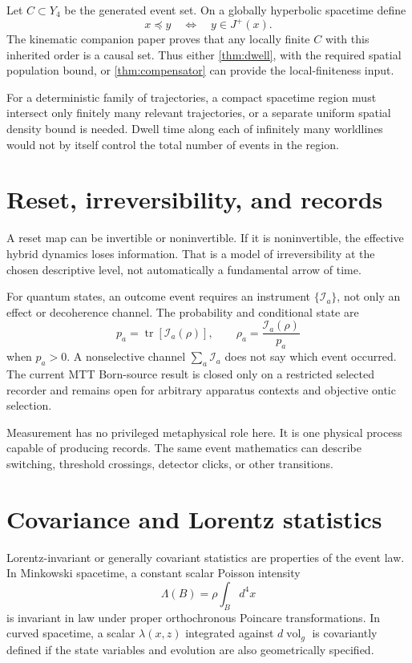 \documentclass[11pt]{article}
\theoremstyle{definition}
\theoremstyle{remark}
\newcommand{\vol}{\operatorname{vol}}
\newcommand{\tr}{\operatorname{tr}}
\begin{document}
Let \(C\subset Y_4\) be the generated event set. On a globally hyperbolic
spacetime define
\[
 x\preceq y
 \quad\Longleftrightarrow\quad
 y\in J^+(x).
\]
The kinematic companion paper proves that any locally finite \(C\) with
this inherited order is a causal set. Thus either
\autoref{thm:dwell}, with the required spatial population bound, or
\autoref{thm:compensator} can provide the local-finiteness input.

For a deterministic family of trajectories, a compact spacetime region must
intersect only finitely many relevant trajectories, or a separate uniform
spatial density bound is needed. Dwell time along each of infinitely many
worldlines would not by itself control the total number of events in the
region.

\section{Reset, irreversibility, and records}

A reset map can be invertible or noninvertible. If it is noninvertible, the
effective hybrid dynamics loses information. That is a model of
irreversibility at the chosen descriptive level, not automatically a
fundamental arrow of time.

For quantum states, an outcome event requires an instrument
\(\{\mathcal I_a\}\), not only an effect or decoherence channel. The
probability and conditional state are
\[
 p_a=\tr[\mathcal I_a(\rho)],
 \qquad
 \rho_a=\frac{\mathcal I_a(\rho)}{p_a}
\]
when \(p_a>0\). A nonselective channel
\(\sum_a\mathcal I_a\) does not say which event occurred. The current MTT
Born-source result is closed only on a restricted selected recorder and
remains open for arbitrary apparatus contexts and objective ontic
selection.

Measurement has no privileged metaphysical role here. It is one physical
process capable of producing records. The same event mathematics can
describe switching, threshold crossings, detector clicks, or other
transitions.

\section{Covariance and Lorentz statistics}

Lorentz-invariant or generally covariant statistics are properties of the
event law. In Minkowski spacetime, a constant scalar Poisson intensity
\[
 \Lambda(B)=\rho\int_Bd^4x
\]
is invariant in law under proper orthochronous Poincare transformations. In
curved spacetime, a scalar \(\lambda(x,z)\) integrated against
\(d\vol_g\) is covariantly defined if the state variables and evolution are
also geometrically specified.
\end{document}
